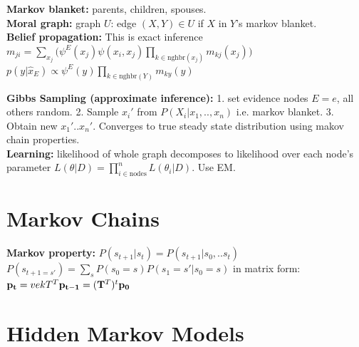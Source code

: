 {\bf Markov blanket: } parents, children, spouses. \\
{\bf Moral graph: } graph $U$: edge $(X, Y) \in U$ if $X$ in $Y$'s markov blanket. \\
{\bf Belief propagation: } This is exact inference $m_{ji} = \sum_{x_j} \bigg( \psi^E(x_j)\psi(x_i, x_j) \prod_{k \in \text{nghbr}(x_j)} m_{kj}(x_j)\bigg)$\\
$p(y \vert \hat{x}_{E}) \propto \psi^{E}(y) \prod_{k \in \text{nghbr}(Y)} m_{ky}(y)$

{\bf Gibbs Sampling (approximate inference):} 1. set evidence nodes $E = e$, all others random. 2. Sample $x_{i}'$ from $P(X_{i} \vert x_1, .., x_n)$ i.e. markov blanket. 3. Obtain new $x_{1}'..x_{n}'$. Converges to true steady state distribution using makov chain properties.\\
{\bf Learning: } likelihood of whole graph decomposes to likelihood over each node's parameter $L(\theta \vert D) = \prod_{i \in \text{nodes}}^{n} L(\theta_i \vert D)$. Use EM.
\section{Markov Chains}
{\bf Markov property: } $P(s_{t+1} \vert s_t) = P(s_{t+1} \vert s_0, .. s_t)$ \\
 $P(s_{t+1 = s'}) = \sum_s P(s_0 = s) P(s_1 = s' \vert s_0 = s)$ in matrix form: $\mathbf{p_t} = vek{T}^T \mathbf{p_{t-1}} = (\mathbf{T}^T)^t\mathbf{p_0}$ 
 
 \section{Hidden Markov Models}
 
